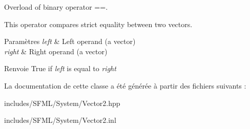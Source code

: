 Overload of binary operator ==. 

This operator compares strict equality between two vectors.


\begin{DoxyParams}{Paramètres}
{\em left} & Left operand (a vector) \\
\hline
{\em right} & Right operand (a vector)\\
\hline
\end{DoxyParams}
\begin{DoxyReturn}{Renvoie}
True if {\itshape left} is equal to {\itshape right} 
\end{DoxyReturn}


La documentation de cette classe a été générée à partir des fichiers suivants \+:\begin{DoxyCompactItemize}
\item 
includes/\+S\+F\+M\+L/\+System/Vector2.\+hpp\item 
includes/\+S\+F\+M\+L/\+System/Vector2.\+inl\end{DoxyCompactItemize}
